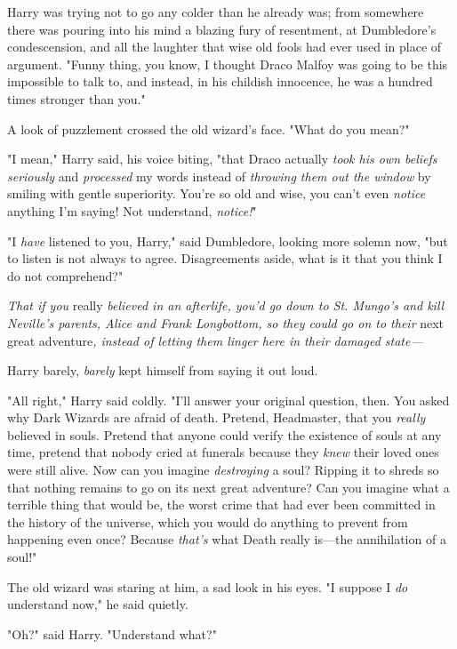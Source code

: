 Harry was trying not to go any colder than he already was; from somewhere there 
was pouring into his mind a blazing fury of resentment, at Dumbledore's 
condescension, and all the laughter that wise old fools had ever used in place 
of argument. "Funny thing, you know, I thought Draco Malfoy was going to be 
this impossible to talk to, and instead, in his childish innocence, he was a 
hundred times stronger than you."

A look of puzzlement crossed the old wizard's face. "What do you mean?"

"I mean," Harry said, his voice biting, "that Draco actually \emph{took his own 
beliefs seriously} and \emph{processed} my words instead of \emph{throwing them 
out the window} by smiling with gentle superiority. You're so old and wise, you 
can't even \emph{notice} anything I'm saying! Not understand, \emph{notice!}"

"I \emph{have} listened to you, Harry," said Dumbledore, looking more solemn 
now, "but to listen is not always to agree. Disagreements aside, what is it 
that you think I do not comprehend?"

\emph{That if you} really\emph{ believed in an afterlife, you'd go down to St. 
Mungo's and kill Neville's parents, Alice and Frank Longbottom, so they could 
go on to their} next great adventure\emph{, instead of letting them linger here 
in their damaged state---}

Harry barely, \emph{barely} kept himself from saying it out loud.

"All right," Harry said coldly. "I'll answer your original question, then. You 
asked why Dark Wizards are afraid of death. Pretend, Headmaster, that you 
\emph{really} believed in souls. Pretend that anyone could verify the existence 
of souls at any time, pretend that nobody cried at funerals because they 
\emph{knew} their loved ones were still alive. Now can you imagine 
\emph{destroying} a soul? Ripping it to shreds so that nothing remains to go on 
its next great adventure? Can you imagine what a terrible thing that would be, 
the worst crime that had ever been committed in the history of the universe, 
which you would do anything to prevent from happening even once? Because 
\emph{that's} what Death really is---the annihilation of a soul!"

The old wizard was staring at him, a sad look in his eyes. "I suppose I 
\emph{do} understand now," he said quietly.

"Oh?" said Harry. "Understand what?"

